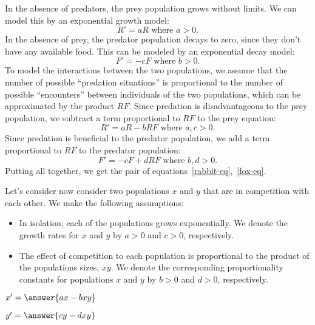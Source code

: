 \documentclass{ximera}
\begin{document}
In the absence of predators, the prey population grows without limits. We can model this by an exponential growth model:
\[
R'=aR\text{ where $a>0$}.
\]
In the absence of prey, the predator population decays to zero, since they don't have any available food. This can be modeled by an exponential decay model:
\[
F'=-cF\text{ where $b>0$.}
\]
To model the interactions between the two populations, we assume that the number of possible ``predation situations'' is proportional to the number of possible ``encounters'' between individuals of the two populations, which can be approximated by the product $RF$.
Since predation is disadvantageous to the prey population, we subtract a term proportional to $RF$ to the prey equation:
\[
R'=aR-bRF\text{ where $a,c>0$}.
\]
Since predation is beneficial to the predator population, we add a term proportional to $RF$ to the predator population:
\[
F'=-cF+dRF\text{ where $b,d>0$.}
\]
Putting all together, we get the pair of equations~\ref{rabbit-eq},~\ref{fox-eq}.

\begin{problem}

Let's consider now consider two populations $x$ and $y$ that are in competition with each other. We make the following assumptions:
\begin{itemize}
\item In isolation, each of the populations grows exponentially. We denote the growth rates for $x$ and $y$ by $a>0$ and $c>0$, respectively. 
\item The effect of competition to each population is proportional to the product of the populations sizes, $xy$. We denote the corresponding proportionality constants for populations $x$ and $y$ by $b>0$ and $d>0$, respectively.
\end{itemize}

\begin{question}
$x'= \answer{ax-bxy}$
\end{question}
\begin{question}
$y'= \answer{cy-dxy}$
\end{question}
\end{problem}

\end{document}
